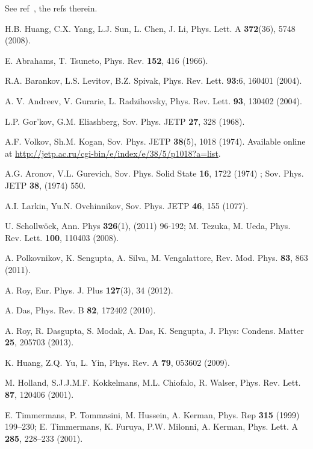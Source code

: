 \documentclass[aps,pra,floats,epsfig,pdflatex]{revtex4}                                                              %
\begin{document}
\begin{thebibliography}{}
See ref~\cite{mypaper4}, the refs therein.

H.B. Huang, C.X. Yang, L.J. Sun, L. Chen, J. Li, Phys. Lett. A \textbf{372}(36), 5748 (2008).

E. Abrahams, T. Tsuneto, Phys. Rev. \textbf{152}, 416 (1966).

R.A. Barankov, L.S. Levitov, B.Z. Spivak, Phys. Rev. Lett. \textbf{93}:6, 160401 (2004).

A. V. Andreev, V. Gurarie, L. Radzihovsky, {Phys. Rev. Lett.} \textbf{93}, 130402 (2004). 

L.P. Gor’kov, G.M. Eliashberg, Sov. Phys. JETP \textbf{27}, 328 (1968).

A.F. Volkov, Sh.M. Kogan, Sov. Phys. JETP \textbf{38}(5), 1018 (1974). Available online at \url{http://jetp.ac.ru/cgi-bin/e/index/e/38/5/p1018?a=list}.

A.G. Aronov, V.L. Gurevich, Sov. Phys. Solid State \textbf{16}, 1722 (1974) ; Sov. Phys. JETP \textbf{38}, (1974) 550.

A.I. Larkin, Yu.N. Ovchinnikov, Sov. Phys. JETP \textbf{46}, 155 (1077).

U. Schollw\"ock, Ann. Phys \textbf{326}(1), (2011) 96-192;  M. Tezuka, M. Ueda,  Phys. Rev. Lett. \textbf{100}, 110403 (2008). 

A. Polkovnikov, K. Sengupta, A. Silva, M. Vengalattore, Rev. Mod. Phys. \textbf{83}, 863 (2011).

A. Roy, Eur. Phys. J. Plus \textbf{127}(3), 34 (2012).

A. Das, Phys. Rev. B \textbf{82}, 172402 (2010).

A. Roy, R. Dasgupta, S. Modak, A. Das, K. Sengupta, J. Phys: Condens. Matter \textbf{25}, 205703 (2013).

K. Huang, Z.Q. Yu, L. Yin, Phys. Rev. A \textbf{79}, 053602 (2009).

M. Holland, S.J.J.M.F. Kokkelmans, M.L. Chiofalo, R. Walser, Phys. Rev. Lett. \textbf{87}, 120406 (2001).

E. Timmermans, P. Tommasini, M. Hussein, A. Kerman, {Phys. Rep} \textbf{315} (1999) 199--230; E. Timmermans, K. Furuya, P.W. Milonni, A. Kerman, {Phys. Lett. A} \textbf{285}, 228--233 (2001).


\end{thebibliography}
\end{document}
